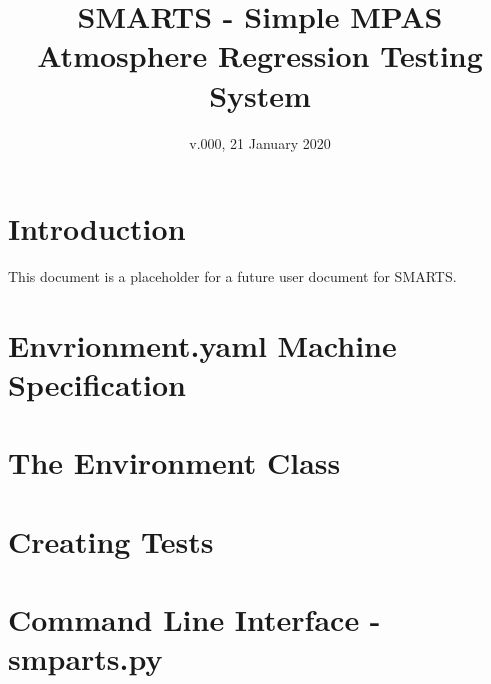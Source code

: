\documentclass[11pt]{report}
\begin{document}
\title{SMARTS - Simple MPAS Atmosphere Regression Testing System}
\date{v.000, 21 January 2020}

\maketitle

\chapter{Introduction}
\label{chap:intro}

This document is a placeholder for a future user document for SMARTS.

\chapter{Envrionment.yaml Machine Specification}

\chapter{The Environment Class}

\chapter{Creating Tests}

\chapter{Command Line Interface - smparts.py}
\end{document}

